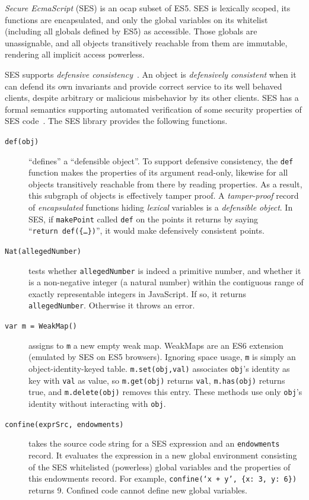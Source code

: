 \documentclass{llncs}
\begin{document}
\emph{Secure EcmaScript} (SES) is an ocap subset of ES5. SES is lexically scoped, its functions are encapsulated, and only the global variables on its whitelist (including all globals defined by ES5) as accessible. Those globals  are unassignable, and all objects transitively reachable from them are immutable, rendering all implicit access powerless. 

SES supports \emph{defensive consistency}~\cite{RobustComposition}. An object is \emph{defensively consistent} when it can defend its own invariants and provide correct service to its well behaved clients, despite arbitrary or malicious misbehavior by its other clients. SES has a formal semantics supporting automated verification of some security properties of SES code~\cite{taly2011automated}. The SES library provides the following functions.

\begin{description}
\item[{\tt def(obj)}]  ``defines'' a ``defensible object''. To support defensive consistency, the {\tt def} function makes the properties of its argument read-only, likewise for all objects transitively reachable from there by reading properties. As a result, this subgraph of objects is effectively tamper proof. A \emph{tamper-proof} record of \emph{encapsulated} functions hiding \emph{lexical} variables is a \emph{defensible object}. In SES, if {\tt makePoint} called {\tt def} on the points it returns by saying ``{\tt return~def(\{\ldots\})}'', it would make defensively consistent points.

\item[{\tt Nat(allegedNumber)}] tests whether {\tt allegedNumber} is indeed a primitive number, and whether it is a non-negative integer (a natural number) within the contiguous range of exactly representable integers in JavaScript. If so, it returns {\tt allegedNumber}. Otherwise it throws an error.

\item[{\tt var m = WeakMap()}] assigns to {\tt m} a new empty weak map. WeakMaps are an ES6 extension (emulated by SES on ES5 browsers). Ignoring space usage, {\tt m} is simply an object-identity-keyed table. {\tt m.set(obj,val)} associates {\tt obj}'s identity as key with {\tt val} as value, so {\tt m.get(obj)} returns {\tt val}, {\tt m.has(obj)} returns true, and {\tt m.delete(obj)} removes this entry. These methods use only {\tt obj}'s identity without interacting with {\tt obj}.

\item[{\tt confine(exprSrc, endowments)}] takes the source code string for a SES expression and an {\tt endowments} record. It evaluates the expression in a new global environment consisting of the SES whitelisted (powerless) global variables and the properties of this endowments record. For example, {\tt confine(`x~+~y',~\{x:~3,~y:~6\})} returns 9. Confined code cannot define new global variables.


\end{description}
\end{document}
